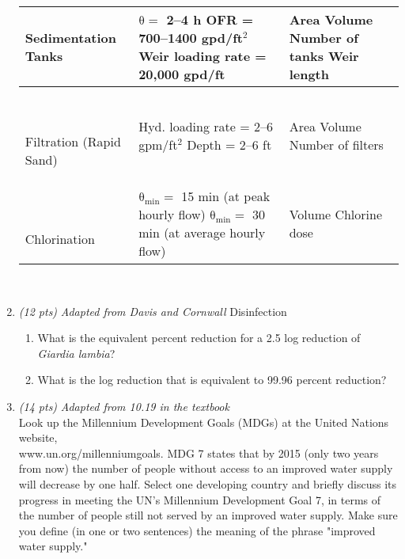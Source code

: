 \documentclass[11pt,letterpaper]{article}
\begin{document}
\begin{enumerate}
\begin{minipage}{\linewidth}
\begin{tabular}{|p{50mm}|p{70mm}|p{30mm}|}
Sedimentation Tanks & $\mathrm{\theta =}$ 2--4 h \newline OFR = 700--1400 gpd/ft$^2$ \newline Weir loading rate = 20,000 gpd/ft & Area \newline Volume \newline Number of tanks \newline Weir length\\ \hline\

Filtration (Rapid Sand) & Hyd. loading rate = 2--6 gpm/ft$^2$ \newline Depth = 2--6 ft & Area \newline Volume \newline Number of filters\\ \hline\

Chlorination & $\mathrm{\theta_{min} =}$ 15 min (at peak hourly flow) \newline $\mathrm{\theta_{min} =}$ 30 min (at average hourly flow) & Volume \newline Chlorine dose\\ 


\bottomrule[1.25pt]

\end {tabular}\par
\end{minipage}\\

\vspace{1in}


\item \emph{(12 pts)} \emph{Adapted from Davis and Cornwall} Disinfection
\begin{enumerate}
\item What is the equivalent percent reduction for a 2.5 log reduction of \emph{Giardia lambia}? 

\item What is the log reduction that is equivalent to 99.96 percent reduction?
\end{enumerate}

\item \emph{(14 pts)} \emph{Adapted from 10.19 in the textbook}\\
Look up the Millennium Development Goals (MDGs) at the United Nations website,\\ www.un.org/millenniumgoals.  MDG 7 states that by 2015 (only two years from now) the number of people without access to an improved water supply will decrease by one half.  Select one developing country and briefly discuss its progress in meeting the UN's Millennium Development Goal 7, in terms of the number of people still not served by an improved water supply.  Make sure you define (in one or two sentences) the meaning of the phrase "improved water supply."

\end{enumerate}
\end{document}
